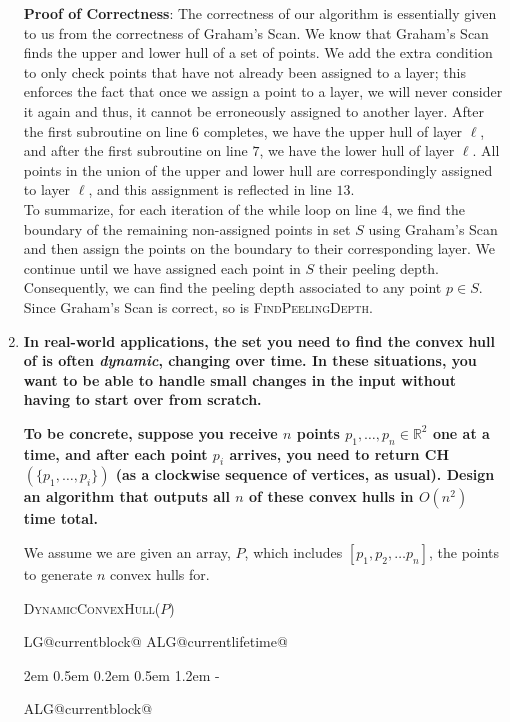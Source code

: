 \documentclass[11pt]{article}
\makeatletter
\newlength{\continueindent}
\renewenvironment{algorithmic}[1][0]%
   {%
   \edef\ALG@numberfreq{#1}%
   \def\@currentlabel{\theALG@line}%
   \setcounter{ALG@line}{0}%
   \setcounter{ALG@rem}{0}%
   \let\\\algbreak%
   \expandafter\edef\csname ALG@currentblock@\theALG@nested\endcsname{0}%
   \expandafter\let\csname ALG@currentlifetime@\theALG@nested\endcsname\relax%
   \begin{list}%
      {\ALG@step}%
      {%
      \rightmargin\z@%
      \itemsep\z@ \itemindent\z@ \listparindent2em%
      \partopsep\z@ \parskip\z@ \parsep\z@%
      \labelsep 0.5em \topsep 0.2em%
      \ifthenelse{\equal{#1}{0}}%
         {\labelwidth 0.5em}%
         {\labelwidth 1.2em}%
       \leftmargin\labelwidth \addtolength{\leftmargin}{\labelsep}
      \ALG@tlm\z@%
      }%
      \parshape 2 \leftmargin \linewidth \continueindent \dimexpr\linewidth-\continueindent\relax
   \setcounter{ALG@nested}{0}%
   \ALG@beginalgorithmic%
   }%
   {%
   \ALG@closeloops%
   \expandafter\ifnum\csname ALG@currentblock@\theALG@nested\endcsname=0\relax%
   \else%
      \PackageError{algorithmicx}{Some blocks are not closed!!!}{}%
   \fi%
   \ALG@endalgorithmic%
   \end{list}%
   }%
\makeatother
\begin{document}
\begin{enumerate}
 \textbf{Proof of Correctness}: The correctness of our algorithm is essentially given to us from the correctness of Graham's Scan. We know that Graham's Scan finds the upper and lower hull of a set of points. We add the extra condition to only check points that have not already been assigned to a layer; this enforces the fact that once we assign a point to a layer, we will never consider it again and thus, it cannot be erroneously assigned to another layer. After the first subroutine on line $6$ completes, we have the upper hull of layer $\ell$, and after the first subroutine on line $7$, we have the lower hull of layer $\ell$. All points in the union of the upper and lower hull are correspondingly assigned to layer $\ell$, and this assignment is reflected in line $13$. \\

To summarize, for each iteration of the while loop on line $4$, we find the boundary of the remaining non-assigned points in set $S$ using Graham's Scan and then assign the points on the boundary to their corresponding layer. We continue until we have assigned each point in $S$ their peeling depth. Consequently, we can find the peeling depth associated to any point $p \in S$. Since Graham's Scan is correct, so is \textsc{FindPeelingDepth}. 

\newpage

\item \textbf{In real-world applications, the set you need to find the convex hull of is often \textit{dynamic}, changing over time. In these situations, you want to be able to handle small changes in the input without having to start over from scratch.}

\textbf{To be concrete, suppose you receive $n$ points $p_1 , \dots , p_n \in \mathbb{R}^2$ one at a time, and after each
point $p_i$ arrives, you need to return CH$(\{p_1, \dots , p_i\})$ (as a clockwise sequence of vertices, as usual). Design an algorithm that outputs all $n$ of these convex hulls in $O(n^2)$ time total.} 

We assume we are given an array, $P$, which includes $[p_1, p_2, \dots p_n]$, the points to generate $n$ convex hulls for.

\begin{minipage}[t]{0.9\textwidth}
\begin{algorithm}[H]
\caption{\textsc{DynamicConvexHull($P$)}}
\begin{algorithmic}[1]
    \EndFor


\end{algorithmic}
\end{algorithm}
\end{minipage}
\end{enumerate}
\end{document}
